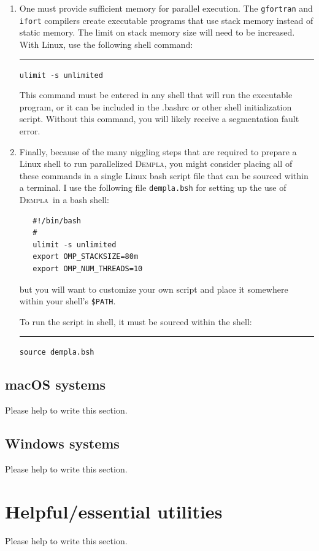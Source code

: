 \documentclass[letterpaper,11pt]{article}
\newcommand{\Dempla}{\textsc{Dempla}}
\begin{document}
\begin{enumerate}
\rule{3ex}{0ex}\texttt{OMP\_NUM\_THREADS=4 OMP\_STACKSIZE=80m ./dempla.exe}
%
\item
One must provide sufficient memory for parallel execution.
The \texttt{gfortran} and \texttt{ifort}
compilers create executable programs
that use stack memory instead of static memory.
The limit on stack memory size will need to be increased.
With Linux,
use the following shell command:\\
\rule{3ex}{0ex}\texttt{ulimit -s unlimited}
\par
This command must be entered in any shell that will run the
executable program, or it can be included in the .bashrc or other
shell initialization script.  Without this command, you will
likely receive a segmentation fault error.
%
\item
Finally, because of the many niggling steps that
are required to prepare a Linux shell to run parallelized
\Dempla, you might consider placing all of these
commands in a single Linux bash script file that can
be sourced within a terminal.
I use the following file \texttt{dempla.bsh} for setting up
the use of \Dempla\ in a bash shell:
\begin{verbatim}
   #!/bin/bash
   #
   ulimit -s unlimited
   export OMP_STACKSIZE=80m
   export OMP_NUM_THREADS=10
\end{verbatim}
but you will want to customize your own script and place it
somewhere within your shell's \texttt{\$PATH}.
\par
To run the script in shell, it must be sourced within the shell:\\
\rule{3ex}{0ex}\texttt{source dempla.bsh}
%
\end{enumerate}
%
\subsection{macOS systems}
Please help to write this section.
%
\subsection{Windows systems}
Please help to write this section.
%
%
\section{Helpful/essential utilities}\label{sec:Utilities}
Please help to write this section.
%
%
\end{document}
